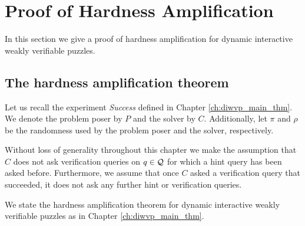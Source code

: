%
\section{Proof of Hardness Amplification}
In this section we give a proof of hardness amplification for dynamic interactive weakly verifiable puzzles.
\label{st:main_theorem}%
\subsection{The hardness amplification theorem}
\label{subst:main_theorem}%
Let us recall the experiment \textit{Success} defined in Chapter \ref{ch:diwvp_main_thm}.
We denote the problem poser by $P$ and the solver by $C$. Additionally, let $\pi$ and $\rho$ be the randomness used by
the problem poser and the solver, respectively.

\success*

Without loss of generality throughout this chapter we make the assumption that $C$ does not ask verification queries on $q \in \mathcal{Q}$
for which a hint query has been asked before. Furthermore, we assume that once $C$ asked
a verification query that succeeded, it does not ask any further hint or verification queries.

We state the hardness amplification theorem for dynamic interactive weakly verifiable puzzles as in Chapter \ref{ch:diwvp_main_thm}.
\hardnessAmpfDiwvp*
%
